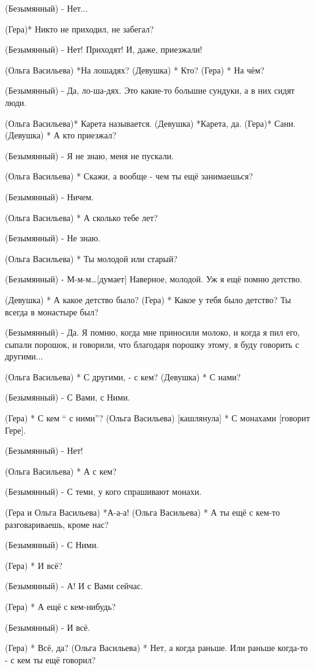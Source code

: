 (Безымянный) - Нет...

(Гера)* Никто не приходил, не забегал?

(Безымянный) - Нет! Приходят!  И, даже, приезжали! 

(Ольга Васильева) *На лошадях?
(Девушка) * Кто?
(Гера) * На чём?

(Безымянный) - Да, ло-ша-дях. Это какие-то большие сундуки, а в них сидят люди.

(Ольга Васильева)*  Карета называется.
(Девушка) *Карета, да.
(Гера)*  Сани.
(Девушка) * А кто приезжал?

(Безымянный) - Я не знаю, меня не пускали.

(Ольга Васильева) * Скажи, а вообще - чем ты ещё занимаешься?

(Безымянный) - Ничем.

(Ольга Васильева) * А сколько тебе лет?

(Безымянный) - Не знаю.

(Ольга Васильева) * Ты молодой или старый?

(Безымянный) - М-м-м…[думает] Наверное, молодой. Уж я ещё помню детство.

(Девушка) * А какое детство было?
(Гера) * Какое у тебя  было детство? Ты всегда в монастыре был?

(Безымянный) - Да. Я помню, когда мне приносили молоко, и когда я пил его, сыпали порошок, и говорили, что благодаря порошку этому, я буду говорить с другими... 

(Ольга Васильева) * С другими, - с кем?
(Девушка) * С нами?

(Безымянный) - С Вами, с Ними.

(Гера) * С кем  “ с ними”?
(Ольга Васильева) [кашлянула] * С монахами [говорит Гере].

(Безымянный) - Нет!

(Ольга Васильева) * А с кем?

(Безымянный) - С теми, у кого спрашивают монахи.

(Гера и Ольга Васильева)  *А-а-а!
(Ольга Васильева) * А ты ещё с кем-то разговариваешь, кроме нас?

(Безымянный) - С Ними.

(Гера) * И всё?

(Безымянный) - А! И с Вами сейчас.

(Гера) * А ещё с кем-нибудь?

(Безымянный) - И всё.

(Гера) * Всё, да?
(Ольга Васильева) * Нет, а когда раньше. Или раньше когда-то - с кем ты ещё говорил?

